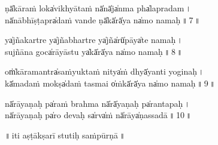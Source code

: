 \documentclass[parskip, DIV=18]{scrartcl}
\begin{document}

\noindent ṇā̍kāraṁ loka̍vikhyā॒taṁ nā̍nā̍ja̍nma pha̍lapra॒da॒m\,। \\
nā̍nābhīṣṭapra̍daṁ va॒nde ṇā̍kā̍rā̍ya na̍mo na॒ma॒ḥ॒\,॥\,7\,॥ \par


\noindent ya̍jñakartre ya̍jñabha॒rtre ya̍jña̍rū̍pāya̍te na॒ma॒ḥ॒\,। \\
su॑jñāna goca̍rāyā॒stu ya̍kā̍rā̍ya na̍mo na॒ma॒ḥ॒\,॥\,8\,॥ \par


\noindent oṁ̍kāramantra̍saṁyu॒ktaṁ ni॑tya̍ṁ dhyā̍yanti॑ yogi॒na॒ḥ॒\,। \\
kā̍madaṁ mokṣa̍daṁ ta॒smai o̍ṁkā̍rā̍ya na̍mo na॒ma॒ḥ॒\,॥\,9\,॥ \par


\noindent nā̍rāyaṇaḥ pa̍raṁ bra॒hma nā̍rā̍yaṇaḥ pa̍ranta॒pa॒ḥ॒\,। \\
nā̍rāyaṇaḥ pa̍ro de॒vaḥ sa̍rva̍ṁ nā̍rāya̍ṇassa॒dā॒\,॥\,10\,॥ \par
 
\vspace{0.5cm}
 
\begin{center}
 ॥\,iti a॒ṣṭākṣarī stu॒ti॒ḥ saṁpū॒rṇā\,॥
\end{center}

\vspace{1.5cm}
\end{document}
